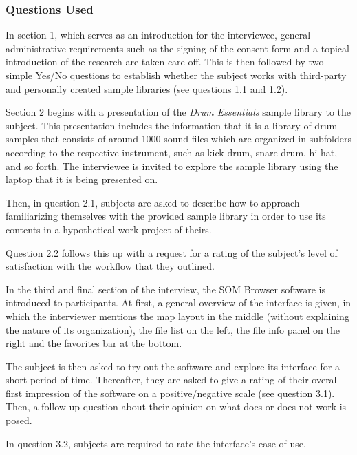 \subsubsection{Questions Used}
\label{subsubsec:questions_used}
In section 1, which serves as an introduction for the interviewee, general
administrative requirements such as the signing of the consent form and a
topical introduction of the research are taken care off. This is then followed
by two simple Yes/No questions to establish whether the subject works with
third-party and personally created sample libraries (see questions 1.1 and
1.2).

\bigskip

Section 2 begins with a presentation of the \textit{Drum Essentials} sample
library to the subject. This presentation includes the information that it is a
library of drum samples that consists of around 1000 sound files which are
organized in subfolders according to the respective instrument, such as kick
drum, snare drum, hi-hat, and so forth. The interviewee is invited to explore
the sample library using the laptop that it is being presented on.

\par
Then, in
question 2.1, subjects are asked to describe how to approach familiarizing
themselves with the provided sample library in order to use its contents in a
hypothetical work project of theirs.

\par
Question 2.2 follows this up with a
request for a rating of the subject's level of satisfaction with the workflow
that they outlined.

\bigskip

In the third and final section of the interview, the SOM Browser software is
introduced to participants. At first, a general overview of the interface is
given, in which the interviewer mentions the map layout in the middle (without
explaining the nature of its organization), the file list on the left, the file
info panel on the right and the favorites bar at the bottom.

\par
The subject is
then asked to try out the software and explore its interface for a short period
of time. Thereafter, they are asked to give a rating of their overall first
impression of the software on a positive/negative scale (see question 3.1).
Then, a follow-up question about their opinion on what does or does not work is
posed.

\par
In question 3.2, subjects are required to rate the interface's ease of
use.

